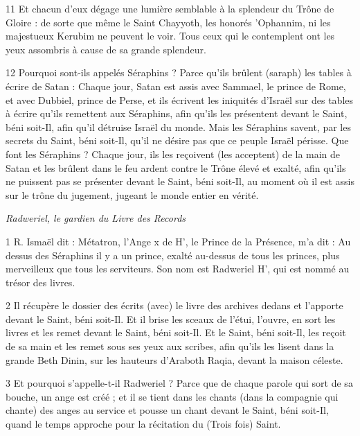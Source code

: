 \par 11 Et chacun d'eux dégage une lumière semblable à la splendeur du Trône de Gloire : de sorte que même le Saint Chayyoth, les honorés 'Ophannim, ni les majestueux Kerubim ne peuvent le voir. Tous ceux qui le contemplent ont les yeux assombris à cause de sa grande splendeur.

\par 12 Pourquoi sont-ils appelés Séraphins ? Parce qu'ils brûlent (saraph) les tables à écrire de Satan : Chaque jour, Satan est assis avec Sammael, le prince de Rome, et avec Dubbiel, prince de Perse, et ils écrivent les iniquités d'Israël sur des tables à écrire qu'ils remettent aux Séraphins, afin qu'ils les présentent devant le Saint, béni soit-Il, afin qu'il détruise Israël du monde. Mais les Séraphins savent, par les secrets du Saint, béni soit-Il, qu'il ne désire pas que ce peuple Israël périsse. Que font les Séraphins ? Chaque jour, ils les reçoivent (les acceptent) de la main de Satan et les brûlent dans le feu ardent contre le Trône élevé et exalté, afin qu'ils ne puissent pas se présenter devant le Saint, béni soit-Il, au moment où il est assis sur le trône du jugement, jugeant le monde entier en vérité.




\par \textit{Radweriel, le gardien du Livre des Records}

\par 1 R. Ismaël dit : Métatron, l'Ange x de H', le Prince de la Présence, m'a dit : Au dessus des Séraphins il y a un prince, exalté au-dessus de tous les princes, plus merveilleux que tous les serviteurs. Son nom est Radweriel H', qui est nommé au trésor des livres.

\par 2 Il récupère le dossier des écrits (avec) le livre des archives dedans et l'apporte devant le Saint, béni soit-Il. Et il brise les sceaux de l'étui, l'ouvre, en sort les livres et les remet devant le Saint, béni soit-Il. Et le Saint, béni soit-Il, les reçoit de sa main et les remet sous ses yeux aux scribes, afin qu'ils les lisent dans la grande Beth Dinin, sur les hauteurs d'Araboth Raqia, devant la maison céleste.

\par 3 Et pourquoi s'appelle-t-il Radweriel ? Parce que de chaque parole qui sort de sa bouche, un ange est créé ; et il se tient dans les chants (dans la compagnie qui chante) des anges au service et pousse un chant devant le Saint, béni soit-Il, quand le temps approche pour la récitation du (Trois fois) Saint.

